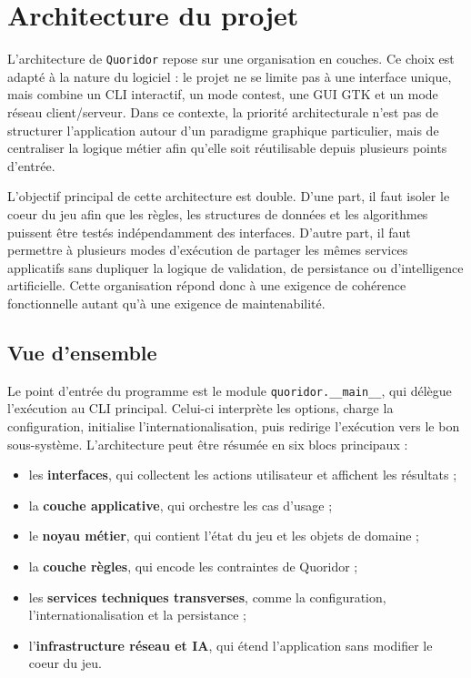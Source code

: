 \section{Architecture du projet}

L'architecture de \texttt{Quoridor} repose sur une organisation en couches.
Ce choix est adapté à la nature du logiciel : le projet ne se limite pas à
une interface unique, mais combine un CLI interactif, un mode contest, une
GUI GTK et un mode réseau client/serveur. Dans ce contexte, la priorité
architecturale n'est pas de structurer l'application autour d'un paradigme
graphique particulier, mais de centraliser la logique métier afin qu'elle soit
réutilisable depuis plusieurs points d'entrée.

L'objectif principal de cette architecture est double. D'une part, il faut
isoler le coeur du jeu afin que les règles, les structures de données et les
algorithmes puissent être testés indépendamment des interfaces. D'autre part,
il faut permettre à plusieurs modes d'exécution de partager les mêmes services
applicatifs sans dupliquer la logique de validation, de persistance ou
d'intelligence artificielle. Cette organisation répond donc à une exigence de
cohérence fonctionnelle autant qu'à une exigence de maintenabilité.

\subsection{Vue d'ensemble}

Le point d'entrée du programme est le module \texttt{quoridor.\_\_main\_\_},
qui délègue l'exécution au CLI principal. Celui-ci interprète les options,
charge la configuration, initialise l'internationalisation, puis redirige
l'exécution vers le bon sous-système. L'architecture peut être résumée en six
blocs principaux :
\begin{itemize}
  \item les \textbf{interfaces}, qui collectent les actions utilisateur et
    affichent les résultats ;
  \item la \textbf{couche applicative}, qui orchestre les cas d'usage ;
  \item le \textbf{noyau métier}, qui contient l'état du jeu et les objets de
    domaine ;
  \item la \textbf{couche règles}, qui encode les contraintes de Quoridor ;
  \item les \textbf{services techniques transverses}, comme la configuration,
    l'internationalisation et la persistance ;
  \item l'\textbf{infrastructure réseau et IA}, qui étend l'application sans
    modifier le coeur du jeu.
\end{itemize}

